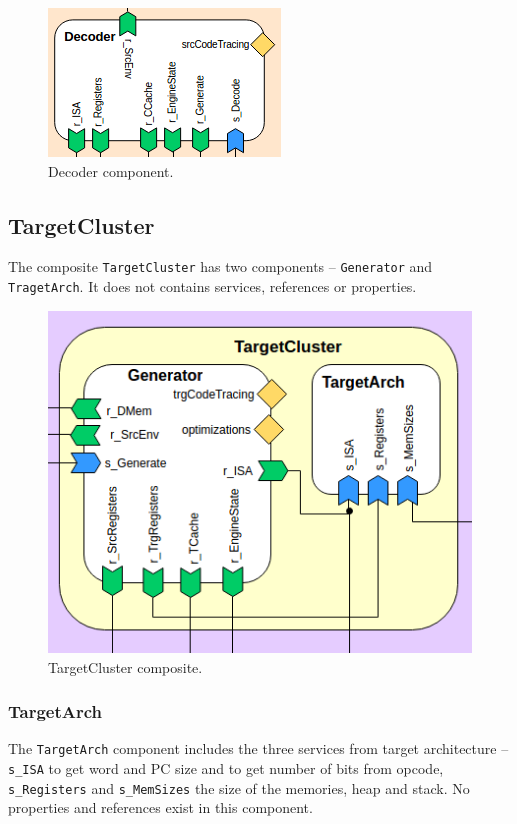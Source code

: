 \documentclass{report}
\begin{document}
			\begin{figure} [H]
				\centering
				\includegraphics[width=0.45\linewidth]{Images/arch-ref/Decoder}
				\caption{Decoder component.}
				\label{fig:Decoder}
			\end{figure}			
		
		
		\subsection{TargetCluster}
		
		\par The composite \texttt{TargetCluster} has two components -- \texttt{Generator} and \texttt{TragetArch}. It does not contains services, references or properties.
		
		\begin{figure} [H]
			\centering
			\includegraphics[width=0.6\linewidth]{Images/arch-ref/TargetCluster}
			\caption{TargetCluster composite.}
			\label{fig:TargetCluster}
		\end{figure}
		
			\subsubsection{TargetArch}
			
			\par The \texttt{TargetArch} component includes the three services from target architecture -- \texttt{s\_ISA} to get word and PC size and to get number of bits from opcode, \texttt{s\_Registers} and \texttt{s\_MemSizes} the size of the memories, heap and stack. No properties and references exist in this component.
			
\end{document}

